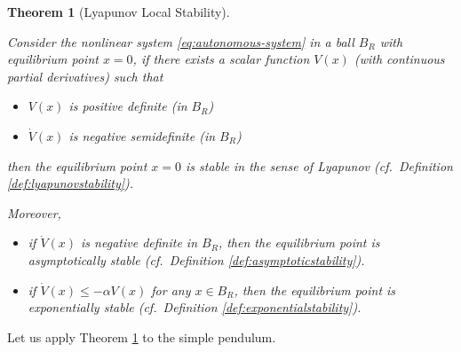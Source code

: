 \documentclass[
]{book}
\newtheorem{theorem}{Theorem}[chapter]
\theoremstyle{definition}
\theoremstyle{definition}
\theoremstyle{definition}
\theoremstyle{definition}
\theoremstyle{remark}
\begin{document}
\begin{theorem}[Lyapunov Local Stability]
\protect\hypertarget{thm:lyapunovlocalstability}{}\label{thm:lyapunovlocalstability}

Consider the nonlinear system \eqref{eq:autonomous-system} in a ball \(B_R\) with equilibrium point \(x=0\), if there exists a scalar function \(V(x)\) (with continuous partial derivatives) such that

\begin{itemize}
\item
  \(V(x)\) is positive definite (in \(B_R\))
\item
  \(\dot{V}(x)\) is negative semidefinite (in \(B_R\))
\end{itemize}

then the equilibrium point \(x=0\) is stable in the sense of Lyapunov (cf.~Definition \ref{def:lyapunovstability}).

Moreover,

\begin{itemize}
\item
  if \(\dot{V}(x)\) is negative definite in \(B_R\), then the equilibrium point is asymptotically stable (cf.~Definition \ref{def:asymptoticstability}).
\item
  if \(\dot{V}(x) \leq - \alpha V(x)\) for any \(x \in B_R\), then the equilibrium point is exponentially stable (cf.~Definition \ref{def:exponentialstability}).
\end{itemize}

\end{theorem}

Let us apply Theorem \ref{thm:lyapunovlocalstability} to the simple pendulum.
\end{document}
